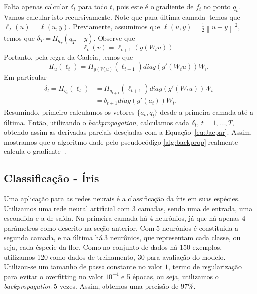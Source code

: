 \documentclass[
	12pt,				%
    oneside,			%
	a4paper,			%
	english,			%
	french,				%
	spanish,			%
	brazil,				%
	]{abntex2}
\newcommand{\norm}[1]{\left\lVert#1\right\rVert}
\begin{document}
            Falta apenas calcular $\delta_t$ para todo $t$, pois este é o gradiente de $f_t$ no ponto $q_t$. Vamos calcular isto recursivamente. Note que para última camada, temos que $\ell_T(u) = \ell(u,y)$.
            Previamente, assumimos que $\ell(u,y) = \frac{1}{2}\norm{u-y}^2$, temos que $\delta_T = H_{q_T}(q_T - y)$. Observe que
            \begin{equation*}
                \ell_t(u) = \ell_{t+1}(g(W_tu)).
            \end{equation*}
            Portanto, pela regra da Cadeia, temos que
            \begin{equation*}
                H_u(\ell_t) = H_{g(W_tu)}(\ell_{t+1})diag(g'(W_tu))W_t.
            \end{equation*}
            Em particular
            \begin{align*}
                \delta_t = H_{q_t}(\ell_t) &= H_{q_{t+1}}(\ell_{t+1})diag(g'(W_tu))W_t \\
                &= \delta_{t+1}diag(g'(a_t))W_t.
            \end{align*}
            Resumindo, primeiro calculamos os vetores $\{a_t,q_t\}$ desde a primeira camada até a última. Então, utilizando o \emph{backpropagation}, calculamos cada $\delta_t$, $t=1,\dots,T$, obtendo assim as derivadas parciais desejadas com a Equação~\eqref{eq:Jacpar}. Assim, mostramos que o algoritmo dado pelo pseudocódigo \ref{alg:backprop} realmente calcula o gradiente~\cite{shai}.

        \subsection{Classificação - Íris}
            Uma aplicação para as redes neurais é a classificação da íris em suas espécies. Utilizamos uma rede neural artificial com 3 camadas, sendo uma de entrada, uma escondida e a de saída. Na primeira camada há 4 neurônios, já que há apenas 4 parâmetros como descrito na seção anterior. Com 5 neurônios é constituida a segunda camada, e na última há 3 neurônios, que representam cada classe, ou seja, cada éspecie da flor.
            Como no conjunto de dados há 150 exemplos, utilizamos 120 como dados de treinamento, 30 para avaliação do modelo. Utilizou-se um tamanho de passo constante no valor $1$, termo de regularização para evitar o overfitting no valor $10^{-4}$ e 5 épocas, ou seja, utilizamos o \emph{backpropagation} 5 vezes.  Assim, obtemos uma precisão de $97\%$. %
\end{document}
